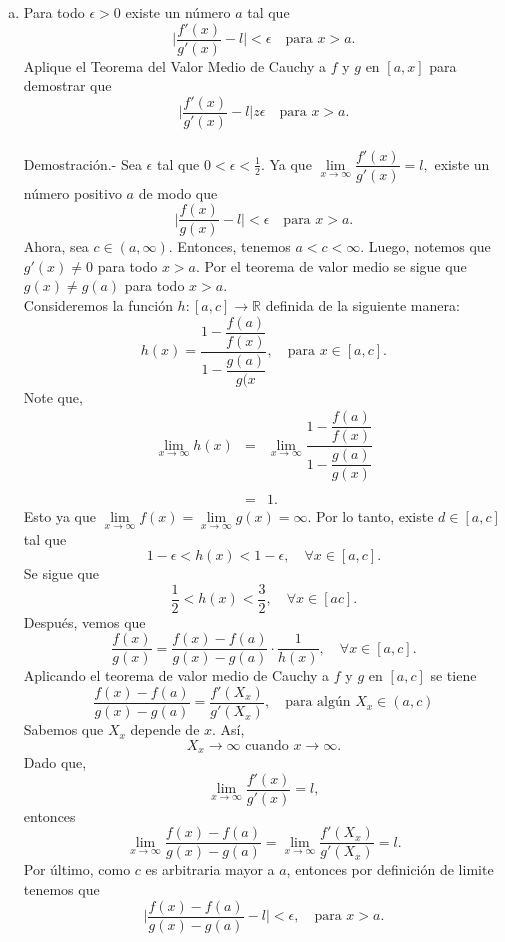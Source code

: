 \begin{enumerate}[\bfseries 1.]
	\begin{enumerate}[(a)]

	    \item Para todo $\epsilon>0$ existe un número $a$ tal que
	    $$\bigg|\dfrac{f'(x)}{g'(x)}-l\bigg|<\epsilon \quad \mbox{para }x>a.$$
	    Aplique el Teorema del Valor Medio de Cauchy a $f$ y $g$ en $[a,x]$ para demostrar que
	    $$\bigg|\dfrac{f'(x)}{g'(x)}-l\bigg|z\epsilon \quad \mbox{para }x>a.$$\\
		Demostración.-\; Sea $\epsilon$ tal que $0<\epsilon<\frac{1}{2}$. Ya que $\lim\limits_{x\to \infty}\dfrac{f'(x)}{g'(x)}=l,$ existe un número positivo $a$ de modo que
		$$\Bigg|\dfrac{f(x)}{g(x)}-l\Bigg|<\epsilon \quad \mbox{para }x>a.$$
		Ahora, sea $c\in (a,\infty)$. Entonces, tenemos $a<c<\infty$. Luego, notemos que $g'(x)\neq 0$ para todo $x>a$. Por el teorema de valor medio se sigue que $g(x)\neq g(a)$ para todo $x>a$. \\
		Consideremos la función $h:[a,c]\to \mathbb{R}$ definida de la siguiente manera:
		$$h(x)=\dfrac{1-\dfrac{f(a)}{f(x)}}{1-\dfrac{g(a)}{g(x}},\quad \mbox{para }x\in[a,c].$$
		Note que,
		$$
		\begin{array}{rcl}
		    \lim\limits_{x\to \infty} h(x) &=& \lim\limits_{x\to \infty} \dfrac{1-\dfrac{f(a)}{f(x)}}{1-\dfrac{g(a)}{g(x)}}\\\\
						   &=& 1.
		\end{array}
		$$
		Esto ya que $\lim\limits_{x\to\infty}f(x)=\lim\limits_{x\to \infty}g(x)=\infty.$ Por lo tanto, existe $d\in [a,c]$ tal que
		$$1-\epsilon < h(x)<1-\epsilon,\quad \forall x \in [a,c].$$
		Se sigue que
		$$\dfrac{1}{2}<h(x)<\dfrac{3}{2},\quad \forall x\in [ac].$$
		Después, vemos que
		$$\dfrac{f(x)}{g(x)}=\dfrac{f(x)-f(a)}{g(x)-g(a)}\cdot \dfrac{1}{h(x)},\quad \forall x\in [a,c].$$
		Aplicando el teorema de valor medio de Cauchy a $f$ y $g$ en $[a,c]$ se tiene
		$$\dfrac{f(x)-f(a)}{g(x)-g(a)}=\dfrac{f'(X_x)}{g'(X_x)},\quad \mbox{para algún }X_x\in(a,c)$$
		Sabemos que $X_x$ depende de $x$. Así,
		$$X_x\to \infty \mbox{ cuando }x\to \infty.$$
		Dado que,
		$$\lim_{x\to \infty}\dfrac{f'(x)}{g'(x)}=l,$$
		entonces
		$$\lim_{x\to \infty}\dfrac{f(x)-f(a)}{g(x)-g(a)}=\lim_{x\to \infty}\dfrac{f'(X_x)}{g'(X_x)}=l.$$
		Por último, como $c$ es arbitraria mayor a $a$, entonces por definición de limite tenemos que
		$$\Bigg|\dfrac{f(x)-f(a)}{g(x)-g(a)}-l\Bigg|<\epsilon,\quad\mbox{para }x>a.$$\\


\end{enumerate}
\end{enumerate}
